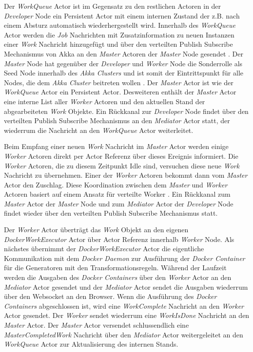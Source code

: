 Der \textit{WorkQueue} Actor ist im Gegensatz zu den restlichen Actoren in der \textit{Developer} Node ein Persistent Actor mit einem internen Zustand der z.B. nach einem Absturz automatisch wiederhergestellt wird. Innerhalb des \textit{WorkQueue} Actor werden die \textit{Job} Nachrichten mit Zusatzinformation zu neuen Instanzen einer \textit{Work} Nachricht hinzugefügt und über den verteilten Publish Subscribe Mechanismus von Akka an den \textit{Master} Actoren der \textit{Master} Node gesendet \cite{akka_distributed_pub_sub}. Der \textit{Master} Node hat gegenüber der \textit{Developer} und \textit{Worker} Node die Sonderrolle als Seed Node innerhalb des \textit{Akka Clusters} und ist somit der Eintrittspunkt für alle Nodes, die dem \textit{Akka Cluster} beitreten wollen \cite{akka_cluster}. Der \textit{Master} Actor ist wie der \textit{WorkQueue} Actor ein Persistent Actor. Desweiteren enthält der \textit{Master} Actor eine interne List aller \textit{Worker} Actoren und den aktuellen Stand der abgearbeiteten \textit{Work} Objekte. Ein Rückkanal zur \textit{Developer} Node findet über den verteilten Publish Subscribe Mechanismus an den \textit{Mediator} Actor statt, der wiederrum die Nachricht an den \textit{WorkQueue} Actor weiterleitet.

Beim Empfang einer neuen \textit{Work} Nachricht im \textit{Master} Actor werden einige \textit{Worker} Actoren direkt per Actor Referenz über dieses Ereignis informiert. Die \textit{Worker} Actoren, die zu diesem Zeitpunkt Idle sind, versuchen diese neue \textit{Work} Nachricht zu übernehmen. Einer der \textit{Worker} Actoren bekommt dann vom \textit{Master} Actor den Zuschlag. Diese Koordination zwischen dem \textit{Master} und \textit{Worker} Actoren basiert auf einem Ansatz für verteilte Worker \cite{akka_worker_pull}. Ein Rückkanal zum \textit{Master} Actor der \textit{Master} Node und zum \textit{Mediator} Actor der \textit{Developer} Node findet wieder über den verteilten Publish Subscribe Mechanismus statt.

Der \textit{Worker} Actor überträgt das \textit{Work} Objekt an den eigenen \textit{DockerWorkExecutor} Actor über Actor Referenz innerhalb \textit{Worker} Node. Als nächstes übernimmt der \textit{DockerWorkExecutor} Actor die eigentliche Kommunikation mit dem \textit{Docker Daemon} zur Ausführung der \textit{Docker Container} für die Generatoren mit den Transformationsregeln. Während der Laufzeit werden die Ausgaben des \textit{Docker Containers} über den \textit{Worker} Actor an den \textit{Mediator} Actor gesendet und der \textit{Mediator} Actor sendet die Ausgaben wiederrum über den Websocket an den Browser. Wenn die Ausführung des \textit{Docker Containers} abgeschlossen ist, wird eine \textit{WorkComplete} Nachricht an den \textit{Worker} Actor gesendet. Der \textit{Worker} sendet wiederrum eine \textit{WorkIsDone} Nachricht an den \textit{Master} Actor. Der \textit{Master} Actor versendet schlussendlich eine \textit{MasterCompletedWork} Nachricht über den \textit{Mediator} Actor weitergeleitet an den \textit{WorkQueue} Actor zur Aktualisierung des internen Stands.

